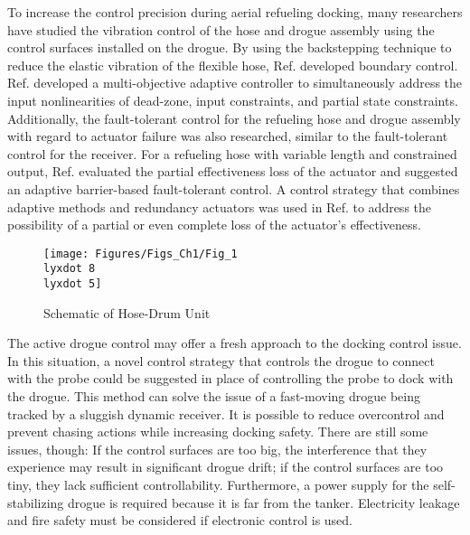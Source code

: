 To increase the control precision during aerial refueling docking,
many researchers have studied the vibration control of the hose and
drogue assembly using the control surfaces installed on the drogue.
By using the backstepping technique to reduce the elastic vibration
of the flexible hose, Ref.\cite{liu2020vibration} developed boundary
control. Ref.\cite{chang2019adaptive} developed a multi-objective
adaptive controller to simultaneously address the input nonlinearities
of dead-zone, input constraints, and partial state constraints. Additionally,
the fault-tolerant control for the refueling hose and drogue assembly
with regard to actuator failure was also researched\cite{liu2021adaptive,liu2022adaptive},
similar to the fault-tolerant control for the receiver. For a refueling
hose with variable length and constrained output, Ref.\cite{liu2021adaptive}
evaluated the partial effectiveness loss of the actuator and suggested
an adaptive barrier-based fault-tolerant control. A control strategy
that combines adaptive methods and redundancy actuators was used in
Ref.\cite{liu2022adaptive} to address the possibility of a partial
or even complete loss of the actuator's effectiveness. 

\begin{figure}
\begin{centering}
\texttt{[image: Figures/Figs\_Ch1/Fig\_1\\lyxdot 8\\lyxdot 5]}
\par\end{centering}
\caption{Schematic of Hose-Drum Unit\cite{liu2022adaptive}}

\centering{}\label{Fig_1.8-5}
\end{figure}

The active drogue control may offer a fresh approach to the docking
control issue. In this situation, a novel control strategy that controls
the drogue to connect with the probe could be suggested in place of
controlling the probe to dock with the drogue. This method can solve
the issue of a fast-moving drogue being tracked by a sluggish dynamic
receiver. It is possible to reduce overcontrol and prevent chasing
actions while increasing docking safety. There are still some issues,
though: If the control surfaces are too big, the interference that
they experience may result in significant drogue drift; if the control
surfaces are too tiny, they lack sufficient controllability. Furthermore,
a power supply for the self-stabilizing drogue is required because
it is far from the tanker. Electricity leakage and fire safety must
be considered if electronic control is used.

